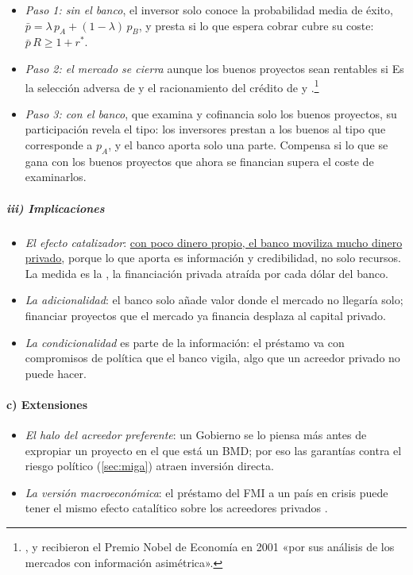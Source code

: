 \documentclass[11pt]{article}
\begin{document}
\begin{itemize}
\item \emph{Paso 1: sin el banco}, el inversor solo conoce la probabilidad media de éxito, $\bar p=\lambda\,p_A+(1-\lambda)\,p_B$, y presta si lo que espera cobrar cubre su coste: $\bar p\,R\geq1+r^*$.
\item \emph{Paso 2: el mercado se cierra} aunque los buenos proyectos sean rentables si
  Es la selección adversa de  y el racionamiento del crédito de  y  .\footnote{,  y  recibieron el Premio Nobel de Economía en 2001 «por sus análisis de los mercados con información asimétrica»\nocite{Nobel2001AkerlofSpenceStiglitz}.}
\item \emph{Paso 3: con el banco}, que examina y cofinancia solo los buenos proyectos, su participación revela el tipo: los inversores prestan a los buenos al tipo que corresponde a $p_A$, y el banco aporta solo una parte. Compensa si lo que se gana con los buenos proyectos que ahora se financian supera el coste de examinarlos.
\end{itemize}

\subparagraph{iii) Implicaciones}

\begin{itemize}
\item \emph{El efecto catalizador}: \uline{con poco dinero propio, el banco moviliza mucho dinero privado}, porque lo que aporta es información y credibilidad, no solo recursos. La medida es la , la financiación privada atraída por cada dólar del banco.
\item \emph{La adicionalidad}: el banco solo añade valor donde el mercado no llegaría solo; financiar proyectos que el mercado ya financia desplaza al capital privado.
\item \emph{La condicionalidad} es parte de la información: el préstamo va con compromisos de política que el banco vigila, algo que un acreedor privado no puede hacer.
\end{itemize}

\paragraph{c) Extensiones}

\begin{itemize}
\item \emph{El halo del acreedor preferente}: un Gobierno se lo piensa más antes de expropiar un proyecto en el que está un BMD; por eso las garantías contra el riesgo político (\ref{sec:miga}) atraen inversión directa.
\item \emph{La versión macroeconómica}: el préstamo del FMI a un país en crisis puede tener el mismo efecto catalítico sobre los acreedores privados .
\end{itemize}
\end{document}
